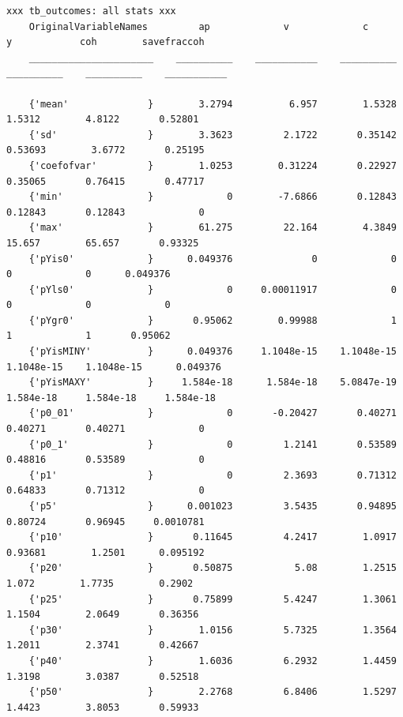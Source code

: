 \documentclass[
]{book}
\begin{document}
\begin{verbatim}
xxx tb_outcomes: all stats xxx
    OriginalVariableNames         ap             v             c             y            coh        savefraccoh
    ______________________    __________    ___________    __________    __________    __________    ___________

    {'mean'              }        3.2794          6.957        1.5328        1.5312        4.8122       0.52801 
    {'sd'                }        3.3623         2.1722       0.35142       0.53693        3.6772       0.25195 
    {'coefofvar'         }        1.0253        0.31224       0.22927       0.35065       0.76415       0.47717 
    {'min'               }             0        -7.6866       0.12843       0.12843       0.12843             0 
    {'max'               }        61.275         22.164        4.3849        15.657        65.657       0.93325 
    {'pYis0'             }      0.049376              0             0             0             0      0.049376 
    {'pYls0'             }             0     0.00011917             0             0             0             0 
    {'pYgr0'             }       0.95062        0.99988             1             1             1       0.95062 
    {'pYisMINY'          }      0.049376     1.1048e-15    1.1048e-15    1.1048e-15    1.1048e-15      0.049376 
    {'pYisMAXY'          }     1.584e-18      1.584e-18    5.0847e-19     1.584e-18     1.584e-18     1.584e-18 
    {'p0_01'             }             0       -0.20427       0.40271       0.40271       0.40271             0 
    {'p0_1'              }             0         1.2141       0.53589       0.48816       0.53589             0 
    {'p1'                }             0         2.3693       0.71312       0.64833       0.71312             0 
    {'p5'                }      0.001023         3.5435       0.94895       0.80724       0.96945     0.0010781 
    {'p10'               }       0.11645         4.2417        1.0917       0.93681        1.2501      0.095192 
    {'p20'               }       0.50875           5.08        1.2515         1.072        1.7735        0.2902 
    {'p25'               }       0.75899         5.4247        1.3061        1.1504        2.0649       0.36356 
    {'p30'               }        1.0156         5.7325        1.3564        1.2011        2.3741       0.42667 
    {'p40'               }        1.6036         6.2932        1.4459        1.3198        3.0387       0.52518 
    {'p50'               }        2.2768         6.8406        1.5297        1.4423        3.8053       0.59933 

\end{verbatim}
\end{document}
